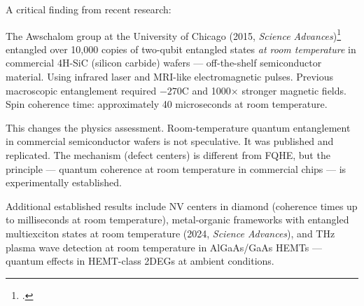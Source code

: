 A critical finding from recent research:

The Awschalom group at the University of Chicago (2015, \textit{Science Advances})\footcite{klimov2015} entangled over 10,000 copies of two-qubit entangled states \textit{at room temperature} in commercial 4H-SiC (silicon carbide) wafers --- off-the-shelf semiconductor material. Using infrared laser and MRI-like electromagnetic pulses. Previous macroscopic entanglement required $-270$\textdegree C and 1000$\times$ stronger magnetic fields. Spin coherence time: approximately 40 microseconds at room temperature.

This changes the physics assessment. Room-temperature quantum entanglement in commercial semiconductor wafers is not speculative. It was published and replicated. The mechanism (defect centers) is different from FQHE, but the principle --- quantum coherence at room temperature in commercial chips --- is experimentally established.

Additional established results include NV centers in diamond (coherence times up to milliseconds at room temperature), metal-organic frameworks with entangled multiexciton states at room temperature (2024, \textit{Science Advances}), and THz plasma wave detection at room temperature in AlGaAs/GaAs HEMTs --- quantum effects in HEMT-class 2DEGs at ambient conditions.


\chapterreturn
